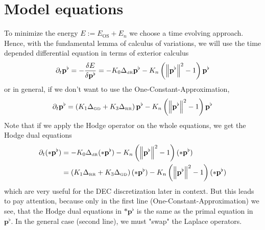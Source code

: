 \documentclass{scrartcl}
\newcommand{\pfl}{\mathbf{p}^{\flat}}
\newcommand{\EOS}{E_{\text{OS}}}
\newcommand{\EN}{E_{n}}
\newcommand{\LB}{\Delta_{\text{\tiny RR}}}
\newcommand{\LCB}{\Delta_{\text{\tiny GD}}}
\newcommand{\LDR}{\Delta_{\text{\tiny dR}}}
\begin{document}
\section{Model equations}
  To minimize the energy \( E := \EOS + \EN \) we choose a time evolving approach. 
  Hence, with the fundamental lemma of calculus of variations, we will use the time depended differential equation in terms of exterior
  calculus
  \begin{align}
    \partial_{t}\pfl = -\frac{\delta E}{\delta\pfl}
                     = -K_{0}\LDR\pfl - K_{n} \left( \left\| \pfl \right\|^{2} - 1 \right)\pfl
  \end{align}
  or in general, if we don't want to use the One-Constant-Approximation,
  \begin{align}
    \partial_{t}\pfl = \left( K_{1}\LCB + K_{3}\LB\right)\pfl - K_{n} \left( \left\| \pfl \right\|^{2} - 1 \right)\pfl
  \end{align}
  Note that if we apply the Hodge operator on the whole equations, we get the Hodge dual equations
  \begin{align}
    \partial_{t}(*\pfl) &= -K_{0}\LDR (*\pfl) - K_{n} \left( \left\| \pfl \right\|^{2} - 1 \right)(*\pfl) \\
                        &=  \left( K_{1}\LB + K_{3}\LCB\right) (*\pfl) - K_{n} \left( \left\| \pfl \right\|^{2} - 1 \right)(*\pfl)
  \end{align}
  which are very useful for the DEC discretization later in context.
  But this leads to pay attention, because only in the first line (One-Constant-Approximation) we see, 
  that the Hodge dual equations in \( *\pfl \) is the same as the primal equation in \( \pfl \). 
  In the general case (second line), we must "swap" the Laplace operators.

  
\end{document}
